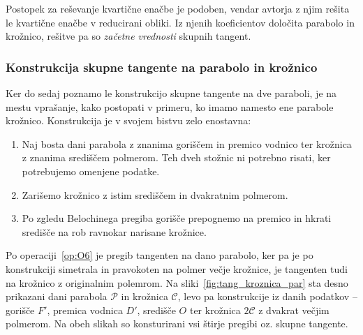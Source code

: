 Postopek za reševanje kvartične enačbe je podoben, vendar avtorja z njim rešita le kvartične enačbe v reducirani obliki. Iz njenih koeficientov določita parabolo in krožnico, rešitve pa so \emph{začetne vrednosti} skupnih tangent.

\subsubsection*{Konstrukcija skupne tangente na parabolo in krožnico}

Ker do sedaj poznamo le konstrukcijo skupne tangente na dve paraboli, je na mestu vprašanje, kako postopati v primeru, ko imamo namesto ene parabole krožnico. Konstrukcija je v svojem bistvu zelo enostavna:
\begin{enumerate}
    \item Naj bosta dani parabola z znanima goriščem in premico vodnico ter krožnica z znanima središčem polmerom. Teh dveh stožnic ni potrebno risati, ker potrebujemo omenjene podatke.
    \item Zarišemo krožnico z istim središčem in dvakratnim polmerom.
    \item Po zgledu Belochinega pregiba gorišče prepognemo na premico in hkrati središče na rob ravnokar narisane krožnice.
\end{enumerate}

Po operaciji~\ref{op:O6} je pregib tangenten na dano parabolo, ker pa je po konstrukciji simetrala in pravokoten na polmer večje krožnice, je tangenten tudi na krožnico z originalnim polemrom. Na sliki~\ref{fig:tang_kroznica_par} sta desno prikazani dani parabola $\mathcal{P}$ in krožnica $\mathcal{C}$, levo pa konstrukcije iz danih podatkov -- gorišče $F'$, premica vodnica $D'$, središče $O$ ter krožnica $2\mathcal{C}$ z dvakrat večjim polmerom. Na obeh slikah so konsturirani vsi štirje pregibi oz. skupne tangente.

